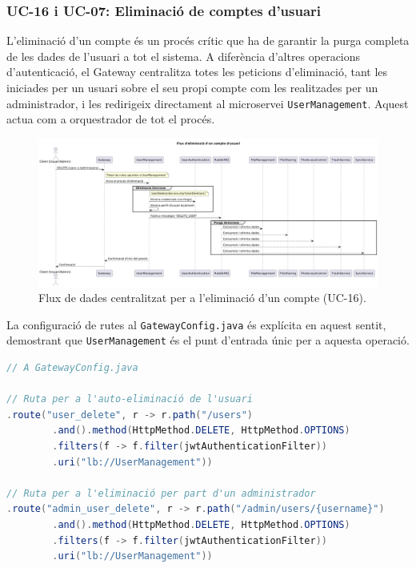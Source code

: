 \subsubsection{UC-16 i UC-07: Eliminació de comptes d'usuari}

L'eliminació d'un compte és un procés crític que ha de garantir la purga completa de les dades de l'usuari a tot el sistema. A diferència d'altres operacions d'autenticació, el Gateway centralitza totes les peticions d'eliminació, tant les iniciades per un usuari sobre el seu propi compte com les realitzades per un administrador, i les redirigeix directament al microservei \texttt{UserManagement}. Aquest actua com a orquestrador de tot el procés.

\begin{figure}[H]
    \centering
    \includegraphics[width=1\textwidth]{Figures/flux/delete_user.png}
    \caption{Flux de dades centralitzat per a l'eliminació d'un compte (UC-16).}
\end{figure}

La configuració de rutes al \texttt{GatewayConfig.java} és explícita en aquest sentit, demostrant que \texttt{UserManagement} és el punt d'entrada únic per a aquesta operació.

\begin{lstlisting}[language=Java, caption={Rutes d'eliminació a `GatewayConfig.java`}]
// A GatewayConfig.java

// Ruta per a l'auto-eliminació de l'usuari
.route("user_delete", r -> r.path("/users")
        .and().method(HttpMethod.DELETE, HttpMethod.OPTIONS)
        .filters(f -> f.filter(jwtAuthenticationFilter))
        .uri("lb://UserManagement"))

// Ruta per a l'eliminació per part d'un administrador
.route("admin_user_delete", r -> r.path("/admin/users/{username}")
        .and().method(HttpMethod.DELETE, HttpMethod.OPTIONS)
        .filters(f -> f.filter(jwtAuthenticationFilter))
        .uri("lb://UserManagement"))
\end{lstlisting}

